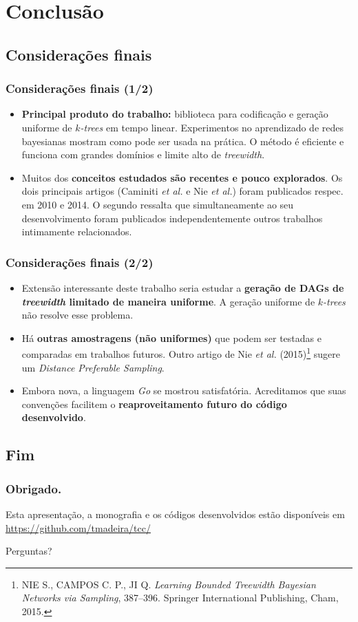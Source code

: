 \documentclass{beamer}
\begin{document}
  \section{Conclusão}

  \subsection{Considerações finais}

  \begin{frame}
    \frametitle{Considerações finais (1/2)}

    \begin{itemize}
      \item \textbf{Principal produto do trabalho:} biblioteca para codificação e geração uniforme de \emph{$k$-trees} em tempo linear. Experimentos no aprendizado de redes bayesianas mostram como pode ser usada na prática. O método é eficiente e funciona com grandes domínios e limite alto de \emph{treewidth}.
      \item Muitos dos \textbf{conceitos estudados são recentes e pouco explorados}. Os dois principais artigos (Caminiti \emph{et al.} e Nie \emph{et al.}) foram publicados respec. em 2010 e 2014. O segundo ressalta que simultaneamente ao seu desenvolvimento foram publicados independentemente outros trabalhos intimamente relacionados.
    \end{itemize}
  \end{frame}

  \begin{frame}
    \frametitle{Considerações finais (2/2)}

    \begin{itemize}
      \item Extensão interessante deste trabalho seria estudar a \textbf{geração de DAGs de \emph{treewidth} limitado de maneira uniforme}. A geração uniforme de \emph{$k$-trees} não resolve esse problema.
      \item Há \textbf{outras amostragens (não uniformes)} que podem ser testadas e comparadas em trabalhos futuros. Outro artigo de Nie \emph{et al.} (2015)\footnote{\scriptsize NIE S., CAMPOS C. P., JI Q. \emph{Learning Bounded Treewidth Bayesian Networks via Sampling}, 387--396. Springer International Publishing, Cham, 2015.} sugere um \emph{Distance Preferable Sampling}.
      \item Embora nova, a linguagem \emph{Go} se mostrou satisfatória. Acreditamos que suas convenções facilitem o \textbf{reaproveitamento futuro do código desenvolvido}.
    \end{itemize}
  \end{frame}

  \subsection{Fim}

  \begin{frame}
    \frametitle{Obrigado.}

    Esta apresentação, a monografia e os códigos desenvolvidos estão disponíveis em \url{https://github.com/tmadeira/tcc/}

    \vspace{1em}

    Perguntas?
  \end{frame}
\end{document}
